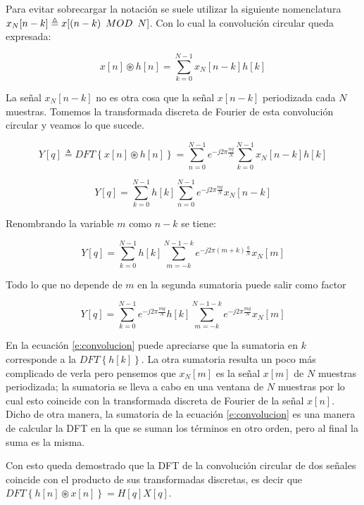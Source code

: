 Para evitar sobrecargar la notación se suele utilizar la siguiente nomenclatura $x_N[n-k] \triangleq x[(n-k) \enskip MOD \enskip N]$. Con lo cual la convolución circular queda expresada:

\begin{equation}
x[n] \circledast h[n] = \sum_{k = 0}^{N-1} x_N[n-k] h[k]
\end{equation} 

La señal $x_N[n-k]$ no es otra cosa que la señal $x[n-k]$ periodizada cada $N$ muestras. Tomemos la transformada discreta de Fourier de esta convolución circular y veamos lo que sucede.

\begin{equation}
Y[q] \triangleq DFT\left\{x[n] \circledast h[n]\right\} = \sum_{n=0}^{N-1}e^{-j2\pi \frac{ nq}{N}} \sum_{k = 0}^{N-1}x_N[n-k]h[k] 
\end{equation}

\begin{equation}
Y[q] = \sum_{k = 0}^{N-1}h[k] \sum_{n=0}^{N-1} e^{-j2\pi \frac{nq}{N}} x_N[n-k]
\end{equation}

Renombrando la variable $m$ como $n - k$ se tiene:

\begin{equation}
Y[q] = \sum_{k = 0}^{N-1}h[k] \sum_{m = -k}^{N-1-k} e^{-j2\pi (m+k)\frac{q}{N}} x_N[m]
\end{equation}

Todo lo que no depende de $m$ en la segunda sumatoria puede salir como factor

\begin{equation}\label{e:convolucion}
Y[q] = \sum_{k = 0}^{N-1}e^{-j2\pi \frac{mq}{N}}h[k] \sum_{m = -k}^{N-1-k} e^{-j2\pi \frac{mq}{N}} x_N[m]
\end{equation}

En la ecuación \ref{e:convolucion} puede apreciarse que la sumatoria en $k$ corresponde a la $DFT\left\{ h[k] \right \}$.
La otra sumatoria resulta un poco más complicado de verla pero pensemos que $x_N[m]$ es la señal $x[m]$ de $N$ muestras periodizada; la sumatoria se lleva a cabo en una ventana de $N$ muestras por lo cual esto coincide con la transformada discreta de Fourier de la señal $x[n]$. Dicho de otra manera, la sumatoria de la ecuación \ref{e:convolucion} es una manera de calcular la DFT en la que se suman los términos en otro orden, pero al final la suma es la misma.

Con esto queda demostrado que la DFT de la convolución circular de dos señales coincide con el producto de sus transformadas discretas, es decir que $DFT\left\{ h[n] \circledast x[n] \right \} = H[q]X[q]$.

